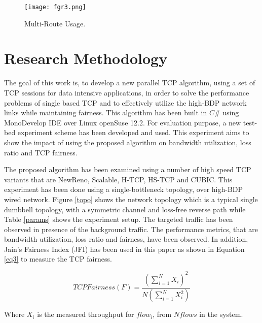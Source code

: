 \documentclass[a4paper, conference]{IEEEtran}
\begin{document}
\begin{figure}[h]
\centerline{\texttt{[image: fgr3.png]}}
\caption{Multi-Route Usage.}
\label{multi-route}
\end{figure}

\section{Research Methodology}

The goal of this work is, to develop a new parallel TCP algorithm, using a set of TCP sessions for data intensive applications, in order to solve the performance problems of single based TCP and to effectively utilize the high-BDP network links while maintaining fairness. This algorithm has been built in $C\#$ using MonoDevelop IDE over Linux openSuse 12.2. For evaluation purpose, a new test-bed experiment scheme \cite{AlrshahThesis} has been developed and used. This experiment aims to show the impact of using the proposed algorithm on bandwidth utilization, loss ratio and TCP fairness. 

The proposed algorithm has been examined using a number of high speed TCP variants that are NewReno, Scalable, H-TCP, HS-TCP and CUBIC. This experiment has been done using a single-bottleneck topology, over high-BDP wired network. Figure \ref{topo} \cite{alrshah2009} shows the network topology which is a typical single dumbbell topology, with a symmetric channel and loss-free reverse path while Table \ref{params} shows the experiment setup. The targeted traffic has been observed in presence of the background traffic. The performance metrics, that are bandwidth utilization, loss ratio and fairness, have been observed. In addition, Jain's Fairness Index (JFI) \cite{chiu1989,jain1984} has been used in this paper as shown in Equation \ref{eq3} to measure the TCP fairness.

\begin{equation}
\label{eq3}
TCP Fairness (F) = \frac{(\sum^{N}_{i=1}
X_{i})^{2}}{N(\sum^{N}_{i=1} X^{2}_{i})}
\end{equation}

Where $X_i$ is the measured throughput for $flow_i$, from $N flows$ in the system.
\end{document}
